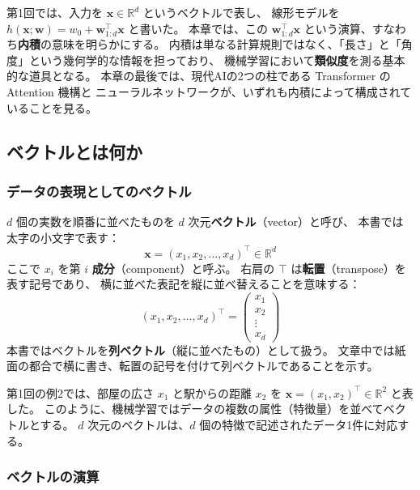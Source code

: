 第1回では、入力を $\bm{x} \in \mathbb{R}^d$ というベクトルで表し、
線形モデルを $h(\bm{x}; \bm{w}) = w_0 + \bm{w}_{1:d}^\top \bm{x}$ と書いた。
本章では、この $\bm{w}_{1:d}^\top \bm{x}$ という演算、すなわち\textbf{内積}の意味を明らかにする。
内積は単なる計算規則ではなく、「長さ」と「角度」という幾何学的な情報を担っており、
機械学習において\textbf{類似度}を測る基本的な道具となる。
本章の最後では、現代AIの2つの柱である Transformer の Attention 機構と
ニューラルネットワークが、いずれも内積によって構成されていることを見る。


\subsection{ベクトルとは何か}

\subsubsection{データの表現としてのベクトル}

$d$ 個の実数を順番に並べたものを $d$ 次元\textbf{ベクトル}（vector）と呼び、
本書では太字の小文字で表す：
\begin{equation}
  \bm{x} = (x_1, x_2, \ldots, x_d)^\top \in \mathbb{R}^d
\end{equation}
ここで $x_i$ を第 $i$ \textbf{成分}（component）と呼ぶ。
右肩の $\top$ は\textbf{転置}（transpose）を表す記号であり、
横に並べた表記を縦に並べ替えることを意味する：
\begin{equation}
  (x_1, x_2, \ldots, x_d)^\top =
  \begin{pmatrix} x_1 \\ x_2 \\ \vdots \\ x_d \end{pmatrix}
\end{equation}
本書ではベクトルを\textbf{列ベクトル}（縦に並べたもの）として扱う。
文章中では紙面の都合で横に書き、転置の記号を付けて列ベクトルであることを示す。

第1回の例2では、部屋の広さ $x_1$ と駅からの距離 $x_2$ を
$\bm{x} = (x_1, x_2)^\top \in \mathbb{R}^2$ と表した。
このように、機械学習ではデータの複数の属性（特徴量）を並べてベクトルとする。
$d$ 次元のベクトルは、$d$ 個の特徴で記述されたデータ1件に対応する。

\subsubsection{ベクトルの演算}

